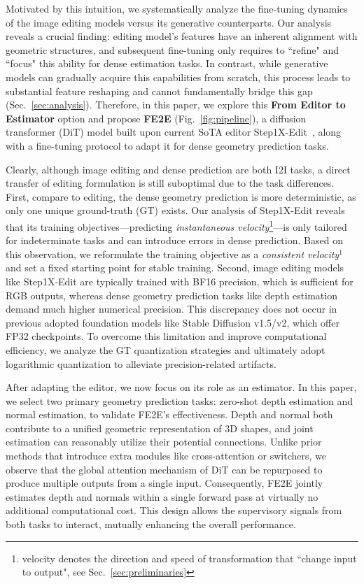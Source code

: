 \documentclass{article} %
\begin{document}
Motivated by this intuition, we systematically analyze the fine-tuning dynamics of the 
image editing models versus its generative counterparts. Our analysis reveals a crucial finding: editing model's features have an inherent alignment with geometric structures, and subsequent fine-tuning only requires to ``refine" and ``focus" this ability for dense estimation tasks. In contrast, while generative models can gradually acquire this capabilities from scratch, this process leads to substantial feature reshaping and cannot fundamentally bridge this gap (Sec.~\ref{sec:analysis}). Therefore, in this paper, we explore this \textbf{From Editor to Estimator} option and propose \textbf{FE2E} (Fig.~\ref{fig:pipeline}), a diffusion transformer (DiT) model built upon current SoTA editor Step1X-Edit~\citep{step}, along with a fine-tuning protocol to adapt it for dense geometry prediction tasks.

Clearly, although image editing and dense prediction are both I2I tasks, a direct transfer of editing formulation is still suboptimal due to the task differences. 
First, compare to editing, the dense geometry prediction is more deterministic, as only one unique ground-truth (GT) exists. Our analysis of Step1X-Edit reveals that its training objectives—predicting \textit{instantaneous velocity}\footnote{velocity denotes the direction and speed of transformation that ``change input to output", see Sec.~\ref{sec:preliminaries}}—is only tailored for indeterminate tasks and can introduce errors in dense prediction. Based on this observation, we reformulate the training objective as a \textit{consistent velocity}$^1$ and set a fixed starting point for stable training. 
Second, image editing models like Step1X-Edit are typically trained with BF16 precision, which is sufficient for RGB outputs, whereas dense geometry prediction tasks like depth estimation demand much higher numerical precision. This discrepancy does not occur in previous adopted foundation models like Stable Diffusion v1.5/v2, which offer FP32 checkpoints. To overcome this limitation and improve computational efficiency, we analyze the GT quantization strategies and ultimately adopt logarithmic quantization to alleviate precision-related artifacts.

After adapting the editor, we now focus on its role as an estimator. In this paper, we select two primary geometry prediction tasks: zero-shot depth estimation and normal estimation, to validate FE2E's effectiveness. Depth and normal both contribute to a unified geometric representation of 3D shapes, and joint estimation can reasonably utilize their potential connections. Unlike prior methods that introduce extra modules like cross-attention or switchers, we observe that the global attention mechanism of DiT can be repurposed to produce multiple outputs from a single input. Consequently, FE2E jointly estimates depth and normals within a single forward pass at virtually no additional computational cost. This design allows the supervisory signals from both tasks to interact, mutually enhancing the overall performance.
\end{document}
